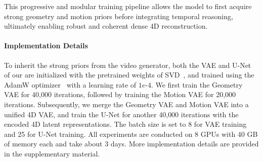 This progressive and modular training pipeline allows the model to first acquire strong geometry and motion priors before integrating temporal reasoning,
ultimately enabling robust and coherent dense 4D reconstruction.

\paragraph{Implementation Details}
To inherit the strong priors from the video generator,
both the VAE and U-Net of our \method{} are initialized with the pretrained weights of SVD~\cite{blattmann2023stable},
and trained using the AdamW optimizer~\cite{loshchilov2017decoupled} with a learning rate of $1e$-$4$. 
We first train the Geometry VAE for 40{,}000 iterations,
followed by training the Motion VAE for 20{,}000 iterations. 
Subsequently,
we merge the Geometry VAE and Motion VAE into a unified 4D VAE,
and train the U-Net for another 40{,}000 iterations with the encoded 4D latent representations.
The batch size is set to 8 for VAE training and 25 for U-Net training.
All experiments are conducted on 8 GPUs with 40 GB of memory each and take about 3 days.
More implementation details are provided in the supplementary material.